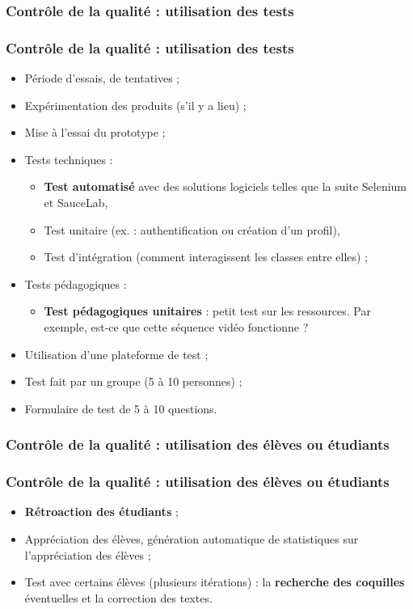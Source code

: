 					\subsubsection{Contrôle de la qualité : utilisation des tests} 
							\begin{frame}
							\frametitle{Contrôle de la qualité : utilisation des tests}
                        			
							\begin{itemize}
							\item Période d’essais, de tentatives ;
							\item Expérimentation des produits (s’il y a lieu) ;
							\item Mise à l’essai du  prototype ;
							\item Tests techniques :
								\begin{itemize}
								\item \textbf{Test automatisé } avec des solutions logiciels telles que la suite Selenium et SauceLab,
								\item Test unitaire (ex. : authentification ou création d’un profil),
								\item Test d’intégration (comment interagissent les classes entre elles) ;
								\end{itemize}
							\item Tests pédagogiques :
								\begin{itemize}
								\item \textbf{Test pédagogiques unitaires} :  petit test sur les ressources. Par exemple, est-ce que cette séquence vidéo fonctionne ?
								\end{itemize}
							\item Utilisation d’une plateforme de test ;
							\item Test fait par un groupe (5 à 10 personnes) ;
							\item Formulaire de test de 5 à 10 questions.
							\end{itemize}						
					\end{frame}
						
					\subsubsection{Contrôle de la qualité : utilisation des élèves ou étudiants} 
							\begin{frame}
							\frametitle{Contrôle de la qualité : utilisation des élèves ou étudiants}
                        			
							\begin{itemize}
							
							\item \textbf{Rétroaction des étudiants} ;
							\item Appréciation des élèves, génération automatique de statistiques sur l’appréciation des élèves  ;
							\item Test avec certains élèves (plusieurs itérations) : la \textbf{recherche des coquilles }éventuelles et la correction des textes.										
							\end{itemize}						
					\end{frame}	
					
